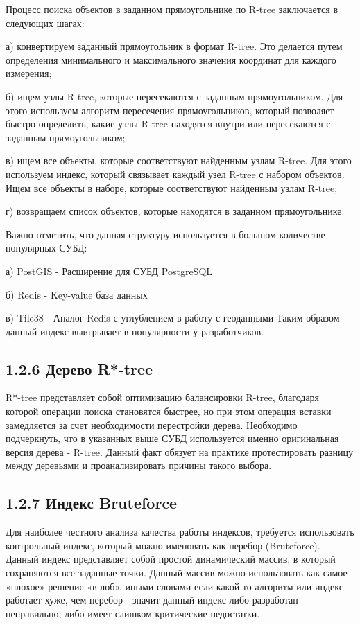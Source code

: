 Процесс поиска объектов в заданном прямоугольнике по R-tree заключается в следующих шагах:
\par а) конвертируем заданный прямоугольник в формат R-tree. Это делается путем определения минимального и максимального значения координат для каждого измерения;
\par б) ищем узлы R-tree, которые пересекаются с заданным прямоугольником. Для этого используем алгоритм пересечения прямоугольников, который позволяет быстро определить, какие узлы R-tree находятся внутри или пересекаются с заданным прямоугольником;
\par в) ищем все объекты, которые соответствуют найденным узлам R-tree. Для этого используем индекс, который связывает каждый узел R-tree с набором объектов. Ищем все объекты в наборе, которые соответствуют найденным узлам R-tree;
\par г) возвращаем список объектов, которые находятся в заданном прямоугольнике.


Важно отметить, что данная структуру используется в большом количестве популярных СУБД: 
\par а) PostGIS - Расширение для СУБД PostgreSQL
\par б) Redis - Key-value база данных
\par в) Tile38 - Аналог Redis с углублением в работу с геоданными
Таким образом данный индекс выигрывает в популярности у разработчиков. 

\subsection{1.2.6 Дерево R*-tree}
R*-tree представляет собой оптимизацию балансировки R-tree\cite{beckmannRStarTree}, благодаря которой операции поиска становятся быстрее, но при этом операция вставки замедляется за счет необходимости перестройки дерева. Необходимо подчеркнуть, что в указанных выше СУБД используется именно оригинальная версия дерева - R-tree\cite{sunRStartree}. Данный факт обязует на практике протестировать разницу между деревьями и проанализировать причины такого выбора\cite{fedorovskieRTree}. 

\subsection{1.2.7 Индекс Bruteforce}
Для наиболее честного анализа качества работы индексов, требуется использовать контрольный индекс, который можно именовать как перебор (Bruteforce). Данный индекс представляет собой простой динамический массив, в который сохраняются все заданные точки. Данный массив можно использовать как самое «плохое» решение «в лоб», иными словами если какой-то алгоритм или индекс работает хуже, чем перебор - значит данный индекс либо разработан неправильно, либо имеет слишком критические недостатки. 

